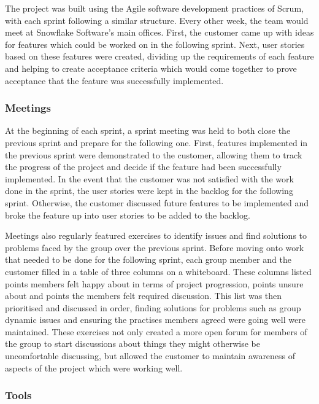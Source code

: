 \documentclass[a4paper, 12pt, twoside]{article}
\begin{document}
The project was built using the Agile software development practices of Scrum, with each sprint following a similar structure. Every other week, the team would meet at Snowflake Software's main offices. First, the customer came up with ideas for features which could be worked on in the following sprint. Next, user stories based on these features were created, dividing up the requirements of each feature and helping to create acceptance criteria which would come together to prove acceptance that the feature was successfully implemented.

\subsubsection{Meetings}

At the beginning of each sprint, a sprint meeting was held to both close the previous sprint and prepare for the following one. First, features implemented in the previous sprint were demonstrated to the customer, allowing them to track the progress of the project and decide if the feature had been successfully implemented. In the event that the customer was not satisfied with the work done in the sprint, the user stories were kept in the backlog for the following sprint. Otherwise, the customer discussed future features to be implemented and broke the feature up into user stories to be added to the backlog.

Meetings also regularly featured exercises to identify issues and find solutions to problems faced by the group over the previous sprint. Before moving onto work that needed to be done for the following sprint, each group member and the customer filled in a table of three columns on a whiteboard. These columns listed points members felt happy about in terms of project progression, points unsure about and points the members felt required discussion. This list was then prioritised and discussed in order, finding solutions for problems such as group dynamic issues and ensuring the practises members agreed were going well were maintained. These exercises not only created a more open forum for members of the group to start discussions about things they might otherwise be uncomfortable discussing, but allowed the customer to maintain awareness of aspects of the project which were working well.

\subsubsection{Tools}
\end{document}
